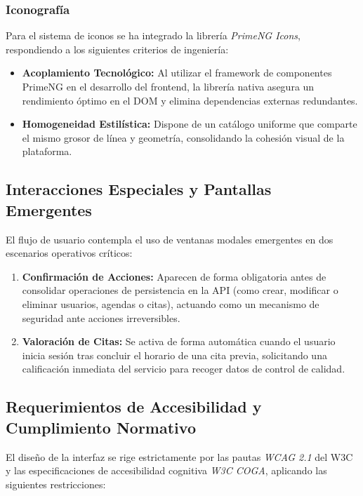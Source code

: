 \subsubsection{Iconografía}
Para el sistema de iconos se ha integrado la librería \textit{PrimeNG Icons}, respondiendo a los siguientes criterios de ingeniería:
\begin{itemize}
    \item \textbf{Acoplamiento Tecnológico:} Al utilizar el framework de componentes PrimeNG en el desarrollo del frontend, la librería nativa asegura un rendimiento óptimo en el DOM y elimina dependencias externas redundantes.
    \item \textbf{Homogeneidad Estilística:} Dispone de un catálogo uniforme que comparte el mismo grosor de línea y geometría, consolidando la cohesión visual de la plataforma.
\end{itemize}

\subsection{Interacciones Especiales y Pantallas Emergentes}
El flujo de usuario contempla el uso de ventanas modales emergentes en dos escenarios operativos críticos:
\begin{enumerate}
    \item \textbf{Confirmación de Acciones:} Aparecen de forma obligatoria antes de consolidar operaciones de persistencia en la API (como crear, modificar o eliminar usuarios, agendas o citas), actuando como un mecanismo de seguridad ante acciones irreversibles.
    \item \textbf{Valoración de Citas:} Se activa de forma automática cuando el usuario inicia sesión tras concluir el horario de una cita previa, solicitando una calificación inmediata del servicio para recoger datos de control de calidad.
\end{enumerate}

\subsection{Requerimientos de Accesibilidad y Cumplimiento Normativo}
El diseño de la interfaz se rige estrictamente por las pautas \textit{WCAG 2.1} del W3C y las especificaciones de accesibilidad cognitiva \textit{W3C COGA}, aplicando las siguientes restricciones:


